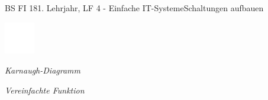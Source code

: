\documentclass[oneside,openany,headings=optiontotoc,11pt,numbers=noenddot]{scrreprt}
\begin{document}
\begin{worksheet}{BS FI 18}{1. Lehrjahr, LF 4 - Einfache IT-Systeme}{Schaltungen aufbauen}
\begin{framed}
			\par\noindent
			\normalsize
			\includegraphics[width=0.1\textwidth]{../../empty.jpg}\\
		\end{framed}
		\begin{framed}
			\begin{minipage}{0.48\textwidth}
				\tiny{\textit{\color{codegray}Karnaugh-Diagramm}}\\
				\normalsize
			\end{minipage}
			\hfill
			\begin{minipage}{0.48\textwidth}
					\begin{minipage}{0.48\textwidth}
					\tiny{\textit{\color{codegray}Vereinfachte Funktion}}\\
					\normalsize
				\end{minipage}
			\end{minipage}
			\begin{minipage}{0.48\textwidth}
				
				\begin{karnaugh-map}[4][2][1][$x_2x_3$][$x_1$]
					
				\end{karnaugh-map}
			\end{minipage}
			\hfill
		\end{framed}
	\end{worksheet}
\end{document}
